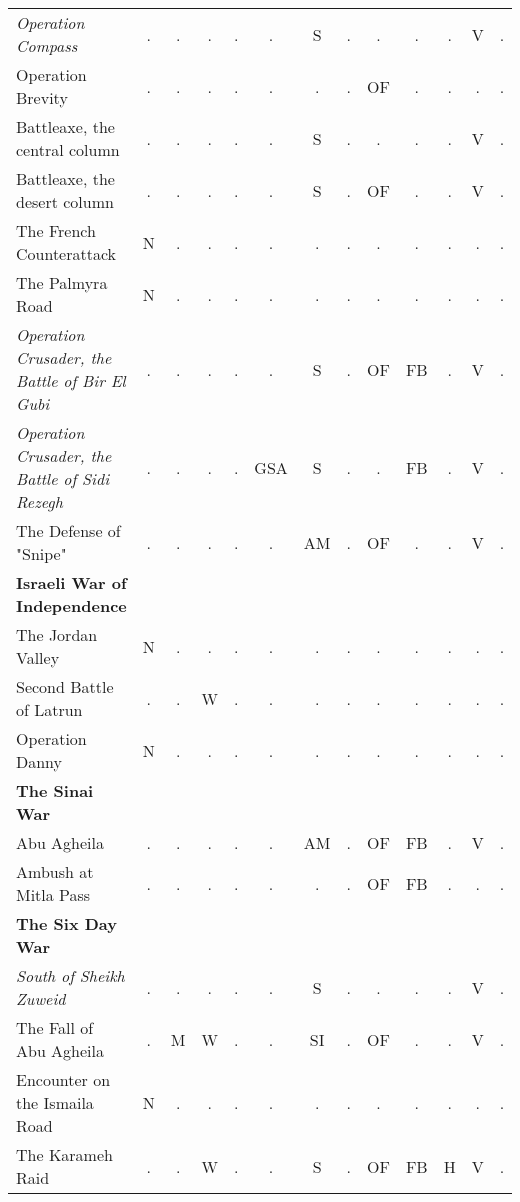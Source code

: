 \documentclass[a4paper]{article}
\newenvironment{texte}{\rmfamily\footnotesize}{}
\begin{document}
\begin{texte}
\begin{tabular}{lcccccccccccc}
\it  Operation Compass                             & . &  . &  . & .  &  .  & S  & . &  . &  . & . &  V & . \\
     Operation Brevity                             & . &  . &  . & .  &  .  & .  & . & OF &  . & . &  . & . \\
     Battleaxe, the central column                 & . &  . &  . & .  &  .  & S  & . &  . &  . & . &  V & . \\
     Battleaxe, the desert column                  & . &  . &  . & .  &  .  & S  & . & OF &  . & . &  V & . \\
     The French Counterattack                      & N &  . &  . & .  &  .  & .  & . &  . &  . & . &  . & . \\
     The Palmyra Road                              & N &  . &  . & .  &  .  & .  & . &  . &  . & . &  . & . \\
\it  Operation Crusader, the Battle of Bir El Gubi & . &  . &  . & .  &  .  & S  & . & OF & FB & . &  V & . \\
\it  Operation Crusader, the Battle of Sidi Rezegh & . &  . &  . & .  & GSA & S  & . &  . & FB & . &  V & . \\
     The Defense of "Snipe"                        & . &  . &  . & .  &  .  & AM & . & OF &  . & . &  V & . \\

\bf Israeli War of Independence \\

     The Jordan Valley                             & N &  . &  . &  . &  .  &  . & . &  . &  . & . &  . & . \\
     Second Battle of Latrun                       & . &  . &  W &  . &  .  &  . & . &  . &  . & . &  . & . \\
     Operation Danny                               & N &  . &  . &  . &  .  &  . & . &  . &  . & . &  . & . \\

\bf The Sinai War \\

     Abu Agheila                                   & . &  . &  . &  . &  .  & AM & . & OF & FB & . &  V & . \\
     Ambush at Mitla Pass                          & . &  . &  . &  . &  .  &  . & . & OF & FB & . &  . & . \\

\bf The Six Day War \\

\it  South of Sheikh Zuweid                        & . &  . &  . &  . &  .  & S  & . &  . &  . & . &  V & . \\
     The Fall of Abu Agheila                       & . &  M &  W &  . &  .  & SI & . & OF &  . & . &  V & . \\
     Encounter on the Ismaila Road                 & N &  . &  . &  . &  .  &  . & . &  . &  . & . &  . & . \\
     The Karameh Raid                              & . &  . &  W &  . &  .  & S  & . & OF & FB & H &  V & . \\


\end{tabular}
\end{texte}
\end{document}
